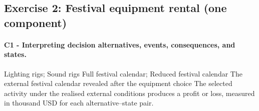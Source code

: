 	\newpage
	\subsection{Exercise 2: Festival equipment rental (one component)}
	\label{sec:problem2-equipment-rental-c1-c3}
	\paragraph*{C1 - Interpreting decision alternatives, events, consequences, and states.}
	\DecisionElementsTable
{Lighting rigs; Sound rigs}
{Full festival calendar; Reduced festival calendar}
{The external festival calendar revealed after the equipment choice}
{The selected activity under the realised external conditions produces a profit or loss, measured in thousand USD for each alternative--state pair.}

